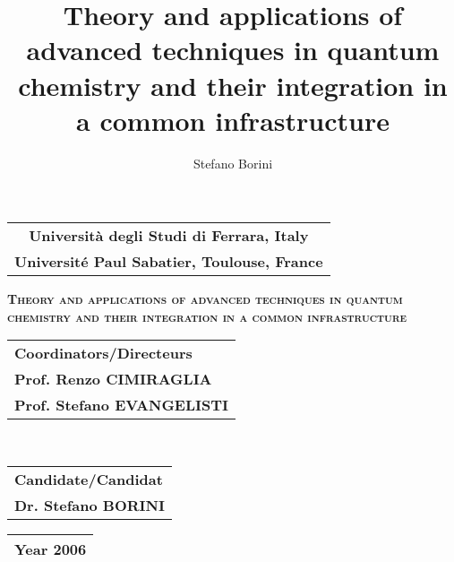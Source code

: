 \documentclass[a4paper,11pt,twoside]{book}
\title{\textbf{Theory and applications of advanced techniques in quantum chemistry
and their integration in a common infrastructure}}
\author{Stefano Borini}
\begin{document}
\begin{titlepage}
\begin{center}
\begin{tabular}{c}
{\Large \textbf{Universit\`a degli Studi di Ferrara, Italy}} \\
{\Large \textbf{Universit\'e Paul Sabatier, Toulouse, France}} \\
\hline
\end{tabular}

\vspace{5cm}
{\textsc{\fontsize{17}{5mm}\selectfont \textbf{Theory and applications of advanced techniques in quantum chemistry
and their integration in a common infrastructure}}}

\vspace{45mm}

{ 
\begin{tabular}{l} \large \textbf{Coordinators/Directeurs} \\
\large \textbf{Prof. Renzo CIMIRAGLIA} \\
\large \textbf{Prof.  Stefano EVANGELISTI}\\
\end{tabular} \hfill {\ } 
 \begin{tabular}{l} \large
\textbf{Candidate/Candidat} \\ \large \textbf{Dr. Stefano BORINI} \end{tabular} }

\vspace{26mm}
\begin{tabular}{c}
\hline
{\large \textbf{Year 2006}} \\
\hline
\end{tabular}

\end{center}
\end{titlepage}
\newpage \pagestyle{empty}
\tableofcontents
\cleardoublepage

\cleardoublepage

\cleardoublepage

\cleardoublepage

\clearpage
\pagestyle{empty}{\ }\\
\clearpage

\cleardoublepage

\clearpage
\pagestyle{empty}{\ }\\
\clearpage

\cleardoublepage

\cleardoublepage

\cleardoublepage

\clearpage
\pagestyle{empty}{\ }\\
\clearpage
{}

\clearpage
\pagestyle{fancy}
\clearpage
{}


\end{document}

